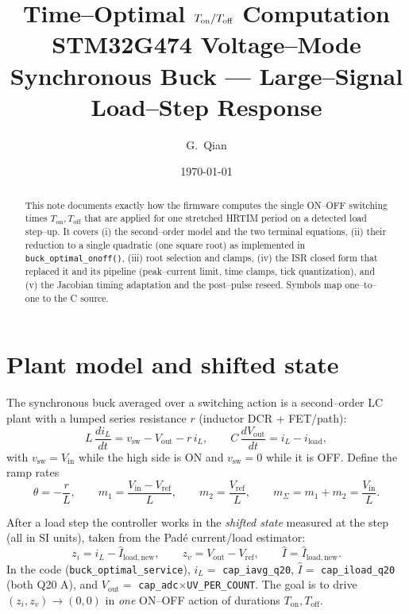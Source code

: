 \documentclass[11pt]{article}
\title{\vspace{-1.5em}Time--Optimal $\Ton/\Toff$ Computation\\[0.3em]
\large STM32G474 Voltage--Mode Synchronous Buck --- Large--Signal Load--Step Response}
\author{G.\ Qian}
\date{\today}
\newcommand{\Ton}{T_{\mathrm{on}}}
\newcommand{\Toff}{T_{\mathrm{off}}}
\newcommand{\Vin}{V_{\mathrm{in}}}
\newcommand{\Vref}{V_{\mathrm{ref}}}
\newcommand{\Vout}{V_{\mathrm{out}}}
\begin{document}
\maketitle
\vspace{-1em}

\begin{abstract}
\noindent This note documents exactly how the firmware computes the single
ON--OFF switching times $\Ton,\Toff$ that are applied for one stretched HRTIM
period on a detected load step--up. It covers (i) the second--order model and the
two terminal equations, (ii) their reduction to a single quadratic (one square
root) as implemented in \texttt{buck\_optimal\_onoff()}, (iii) root selection and
clamps, (iv) the ISR closed form that replaced it and its pipeline (peak--current
limit, time clamps, tick quantization), and (v) the Jacobian timing adaptation
and the post--pulse reseed. Symbols map one--to--one to the C source.\end{abstract}

\section{Plant model and shifted state}
The synchronous buck averaged over a switching action is a second--order LC plant
with a lumped series resistance $r$ (inductor DCR $+$ FET/path):
\begin{equation}
L\,\frac{di_L}{dt}=v_{\mathrm{sw}}-\Vout-r\,i_L,\qquad
C\,\frac{d\Vout}{dt}=i_L-i_{\mathrm{load}},
\end{equation}
with $v_{\mathrm{sw}}=\Vin$ while the high side is ON and $v_{\mathrm{sw}}=0$
while it is OFF. Define the ramp rates
\begin{equation}
\theta=-\frac{r}{L},\qquad
m_1=\frac{\Vin-\Vref}{L},\qquad
m_2=\frac{\Vref}{L},\qquad
m_\Sigma=m_1+m_2=\frac{\Vin}{L}.
\end{equation}

After a load step the controller works in the \emph{shifted state} measured at the
step (all in SI units), taken from the Pad\'e current/load estimator:
\begin{equation}
z_i=i_L-\hat I_{\mathrm{load,new}},\qquad
z_v=\Vout-\Vref,\qquad
\hat I=\hat I_{\mathrm{load,new}} .
\end{equation}
In the code (\texttt{buck\_optimal\_service}), $i_L=$ \texttt{cap\_iavg\_q20},
$\hat I=$ \texttt{cap\_iload\_q20} (both Q20 A), and
$\Vout=$ \texttt{cap\_adc}$\times$\texttt{UV\_PER\_COUNT}. The goal is to drive
$(z_i,z_v)\to(0,0)$ in \emph{one} ON--OFF action of durations $\Ton,\Toff$.
\end{document}
